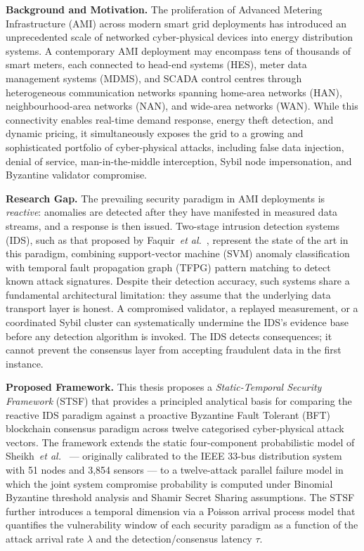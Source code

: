 \documentclass[12pt, oneside, a4paper]{report}
\theoremstyle{definition}
\theoremstyle{remark}
\begin{document}
\noindent\textbf{Background and Motivation.}
The proliferation of Advanced Metering Infrastructure (AMI) across modern smart grid deployments has introduced an unprecedented scale of networked cyber-physical devices into energy distribution systems. A contemporary AMI deployment may encompass tens of thousands of smart meters, each connected to head-end systems (HES), meter data management systems (MDMS), and SCADA control centres through heterogeneous communication networks spanning home-area networks (HAN), neighbourhood-area networks (NAN), and wide-area networks (WAN). While this connectivity enables real-time demand response, energy theft detection, and dynamic pricing, it simultaneously exposes the grid to a growing and sophisticated portfolio of cyber-physical attacks, including false data injection, denial of service, man-in-the-middle interception, Sybil node impersonation, and Byzantine validator compromise.

\medskip

\noindent\textbf{Research Gap.}
The prevailing security paradigm in AMI deployments is \emph{reactive}: anomalies are detected after they have manifested in measured data streams, and a response is then issued. Two-stage intrusion detection systems (IDS), such as that proposed by Faquir~\emph{et al.}~\cite{ids_smart_meter}, represent the state of the art in this paradigm, combining support-vector machine (SVM) anomaly classification with temporal fault propagation graph (TFPG) pattern matching to detect known attack signatures. Despite their detection accuracy, such systems share a fundamental architectural limitation: they assume that the underlying data transport layer is honest. A compromised validator, a replayed measurement, or a coordinated Sybil cluster can systematically undermine the IDS's evidence base before any detection algorithm is invoked. The IDS detects consequences; it cannot prevent the consensus layer from accepting fraudulent data in the first instance.

\medskip

\noindent\textbf{Proposed Framework.}
This thesis proposes a \emph{Static-Temporal Security Framework} (STSF) that provides a principled analytical basis for comparing the reactive IDS paradigm against a proactive Byzantine Fault Tolerant (BFT) blockchain consensus paradigm across twelve categorised cyber-physical attack vectors. The framework extends the static four-component probabilistic model of Sheikh~\emph{et al.}~\cite{sheikh2020} — originally calibrated to the IEEE 33-bus distribution system with 51 nodes and 3,854 sensors — to a twelve-attack parallel failure model in which the joint system compromise probability is computed under Binomial Byzantine threshold analysis and Shamir Secret Sharing assumptions. The STSF further introduces a temporal dimension via a Poisson arrival process model that quantifies the vulnerability window of each security paradigm as a function of the attack arrival rate $\lambda$ and the detection/consensus latency $\tau$.
\end{document}
